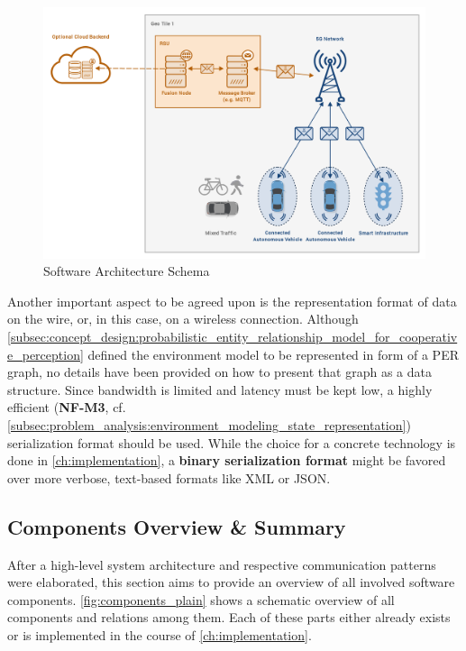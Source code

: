 \begin{figure}
	\centering
	\includegraphics[width=1\linewidth]{98_images/architecture}
	\caption{Software Architecture Schema}
	\label{fig:architecture}
\end{figure}

\par
\bigskip

Another important aspect to be agreed upon is the representation format of data on the wire, or, in this case, on a wireless connection. Although \autoref{subsec:concept_design:probabilistic_entity_relationship_model_for_cooperative_perception} defined the environment model to be represented in form of a PER graph, no details have been provided on how to present that graph as a data structure. Since bandwidth is limited and latency must be kept low, a highly efficient (\textbf{NF-M3}, cf. \autoref{subsec:problem_analysis:environment_modeling_state_representation}) serialization format should be used. While the choice for a concrete technology is done in \autoref{ch:implementation}, a \textbf{binary serialization format} might be favored over more verbose, text-based formats like XML or JSON. 


\subsection{Components Overview \& Summary}
\label{subsec:concept_design:components_overview}
After a high-level system architecture and respective communication patterns were elaborated, this section aims to provide an overview of all involved software components. \autoref{fig:components_plain} shows a schematic overview of all components and relations among them. Each of these parts either already exists or is implemented in the course of \autoref{ch:implementation}.

